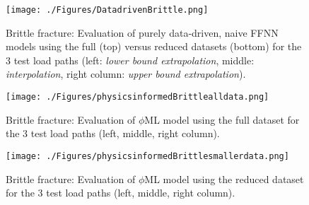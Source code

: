 \documentclass[final,3p,times]{elsarticle}
\begin{document}
\begin{figure}[b]%
\centering
%
 \texttt{[image: ./Figures/DatadrivenBrittle.png]} 
%
\caption{
Brittle fracture: Evaluation of purely data-driven, naive FFNN models using the full (top) versus reduced datasets (bottom) for the 3 test load paths (left: {\it lower bound extrapolation}, middle: {\it interpolation}, right column: {\it upper bound extrapolation}).
}
\label{brit-classical-ML}%
\end{figure}%
%


\begin{figure}[b]%
\centering
%
\texttt{[image: ./Figures/physicsinformedBrittlealldata.png]} 

%
\caption{
Brittle fracture: Evaluation of $\phi$ML model using the full dataset for the 3 test load paths (left, middle, right column).
}
\label{brit-pML-full}%
\end{figure}%




\begin{figure}[b]%
\centering
%
 \texttt{[image: ./Figures/physicsinformedBrittlesmallerdata.png]} 

%
\caption{
Brittle fracture: Evaluation of $\phi$ML model using the reduced dataset for the 3 test load paths (left, middle, right column).
}
\label{brit-pML-reduced}%
\end{figure}%
\end{document}
